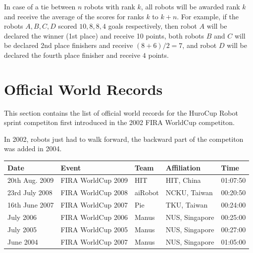 \documentclass[12pt]{hurocup}
\begin{document}
\begin{lawlist}[RD]
\item In case of a tie between $n$ robots with rank $k$, all robots
 will be awarded rank $k$ and receive the average of the scores for
 ranks $k$ to $k+n$.  For example, if the robots $A,B,C,D$ scored $10,
 8, 8, 4$ goals respectively, then robot $A$ will be declared the
 winner (1st place) and receive 10 points, both robots $B$ and $C$
 will be declared 2nd place finishers and receive $(8+6)/2=7$, and
 robot $D$ will be declared the fourth place finisher and receive $4$
 points.

\end{lawlist}

\section{Official World Records}
\label{sec:worldrecords}

This section contains the list of official world records for the
HuroCup Robot sprint competiton first introduced in the 2002 FIRA
WorldCup competiton.

In 2002, robots just had to walk forward, the backward part of the
competiton was added in 2004.

\begin{center}
\begin{tabular}{|lllll|}
\hline
Date & Event & Team & Affiliation & Time \\
\hline
20th Aug. 2009 & FIRA WorldCup 2009 & HIT      & HIT, China     & 01:07:50 \\
23rd July 2008 & FIRA WorldCup 2008 & aiRobot  & NCKU, Taiwan   & 00:20:50 \\
16th June 2007 & FIRA WorldCup 2007 & Pie      & TKU, Taiwan    & 00:24:00 \\
     July 2006 & FIRA WorldCup 2006 & Manus    & NUS, Singapore & 00:25:00 \\
     July 2005 & FIRA WorldCup 2005 & Manus    & NUS, Singapore & 00:27:00 \\
     June 2004 & FIRA WorldCup 2007 & Manus    & NUS, Singapore & 01:05:00 \\
\hline
\end{tabular}
\end{center}
\end{document}
